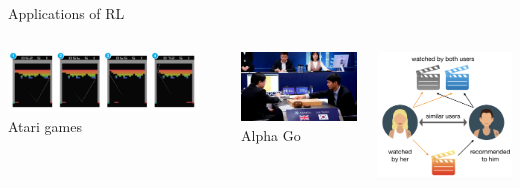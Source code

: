 \documentclass[notes]{beamer} %
\begin{document}
\begin{frame}{Applications of RL}
  \centering
  \begin{columns}
    \column{1em}
    \begin{minipage}{\linewidth}
      \includegraphics[width=0.9\linewidth]{./media/DQN-breakout.png}\\
      Atari games\cite{mnih2015human}
    \end{minipage}\\
    \pause
    \begin{minipage}{\linewidth}
    \includegraphics[width=0.9\linewidth]{./media/alphago-leesedol.png}\\
    Alpha Go\cite{silver2016mastering}
    \end{minipage}
    \pause
    \begin{minipage}{\linewidth}
    \includegraphics[width=0.6\linewidth]{./media/recommender-systems.png}\\

\end{minipage}
\end{columns}
\end{frame}
\end{document}
